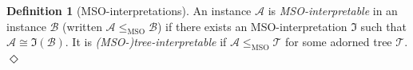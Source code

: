 \documentclass[10pt,a4paper]{amsart}
\theoremstyle{definition}
\numberwithin{equation}{section}
\theoremstyle{plain}
\theoremstyle{definition}
\newtheorem{definition}[definition]{Definition}
\theoremstyle{myexample}
\theoremstyle{plain}
\theoremstyle{definition}
\renewcommand{\vec}[1]{\boldsymbol{#1}}
\newcommand{\adom}[1]{\fcn{dom}(#1)}
\newcommand{\fcn}[1]{\mathsf{#1}}
\newcommand{\pred}[1]{\mathtt{#1}}
\newcommand{\const}[1]{\mathtt{#1}}
\newcommand{\set}[1]{\{#1\}}
\newcommand{\vt}{\vec{t}}
\newcommand{\rpred}{\pred{R}}
\newcommand{\defend}{\hfill\ensuremath{\Diamond}}
\renewcommand{\phi}{\varphi}
\begin{document}
\begin{definition}[MSO-interpretations]


An instance $\mathcal{A}$ is \emph{MSO-interpretable} in an instance $\mathcal{B}$ (written $\mathcal{A} \leq_{\text{MSO}} \mathcal{B}$) if there exists an MSO-interpretation $\mathfrak{I}$ such that $\mathcal{A} \cong \mathfrak{I}(\mathcal{B})$. It is \emph{(MSO-)tree-interpretable} if $\mathcal{A} \leq_{\text{MSO}} \mathcal{T}$ for some adorned tree $\mathcal{T}$.\defend
\end{definition}
\end{document}
